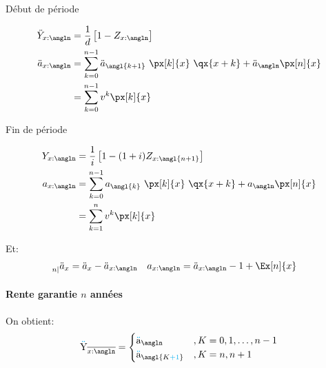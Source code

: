 \documentclass[10pt, french]{article}
\newcommand\cumlaut[2][black]{\stackon[.33ex]{#2}{\textcolor{#1}{\kern-.04ex.\kern-.2ex.}}}
\begin{document}
\begin{multicols*}{3}
\begin{minipage}[t]{0.5\columnwidth}
\begin{center}
Début de période
\end{center}
\begin{align*}
	\ddot{Y}_{x:\angln} 
	&=	\frac{1}{d} \left[ 1 - Z_{x:\angln} \right]	\\
	\ddot{a}_{x:\angln}	
	&=	\sum_{k = 0}^{n - 1} \ddot{a}_{\angl{k + 1}} \ \px[k]{x} \ \qx{x + k}	+	\ddot{a}_{\angln} \px[n]{x}	\\
	&=	\sum_{k = 0}^{n - 1} v^{k} \px[k]{x}
\end{align*}
\end{minipage}
\begin{minipage}[t]{0.5\columnwidth}
\begin{center}
Fin de période
\end{center}
\begin{align*}
	Y_{x:\angln} 
	&=	\frac{1}{i}\left[ 1 - (1 + i) Z_{x:\angl{n + 1}}\right] 	\\
	a_{x:\angln}	
	&=	\sum_{k = 0}^{n - 1} a_{\angl{k}} \ \px[k]{x} \ \qx{x + k}	+	a_{\angln} \px[n]{x}	\\
	&=	\sum_{k = 1}^{n} v^{k} \px[k]{x}
\end{align*}	
\end{minipage}
\setlength{\mathindent}{1cm}

Et:
\begin{align*}
	\prescript{}{n|}{\ddot{a}_{x}}
	&=	\ddot{a}_{x} - \ddot{a}_{x:\angln}	&
	a_{x:\angln}
	&=	\ddot{a}_{x:\angln} - 1 + \Ex[n]{x}
\end{align*}

\paragraph{Rente garantie $n$ années}
On obtient:
\begin{align*}
	\cumlaut[cyan]{Y}_{\overline{x:\angln}} 
	&= 	\begin{cases}
			\cumlaut[cyan]{a}_{\angln}	& , K = 0, 1, \dots, n - 1 \\
			\cumlaut[cyan]{a}_{\angl{K \textcolor{cyan}{+ 1}}}			& , K = n, n + 1 \\
		\end{cases} 	\\
\end{align*}


\end{multicols*}
\end{document}

